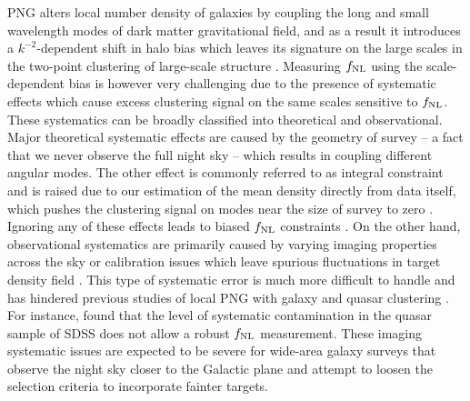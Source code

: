 PNG alters local number density of galaxies by coupling the long and small wavelength modes of dark matter gravitational field, and as a result it introduces a $k^{-2}$-dependent shift in halo bias which leaves its signature on the large scales in the two-point clustering of large-scale structure \citep[see, e.g.,][]{dalal2008imprints}. Measuring $f_{\rm NL}$ using the scale-dependent bias is however very challenging due to the presence of systematic effects which cause excess clustering signal on the same scales sensitive to $f_{\rm NL}$. These systematics can be broadly classified into theoretical and observational. Major theoretical systematic effects are caused by the geometry of survey -- a fact that we never observe the full night sky -- which results in coupling different angular modes. The other effect is commonly referred to as integral constraint and is raised due to our estimation of the mean density directly from data itself, which pushes the clustering signal on modes near the size of survey to zero . Ignoring any of these effects leads to biased $f_{\rm NL}$ constraints . On the other hand, observational systematics are primarily caused by varying imaging properties across the sky or calibration issues which leave spurious fluctuations in target density field . This type of systematic error is much more difficult to handle and has hindered previous studies of local PNG with galaxy and quasar clustering \citep[see, e.g.,][]{Ho2015JCAP...05..040H}. For instance, \cite{pullen2013systematic} found that the level of systematic contamination in the quasar sample of SDSS  does not allow a robust $f_{\rm NL}$ measurement. These imaging systematic issues are expected to be severe for wide-area galaxy surveys that observe the night sky closer to the Galactic plane and attempt to loosen the selection criteria to incorporate fainter targets. 


